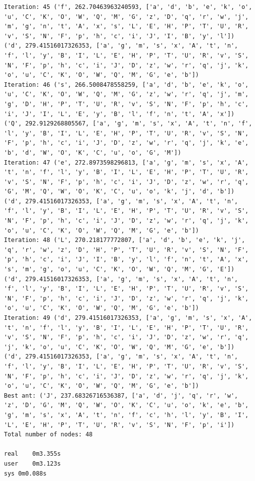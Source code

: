 \documentclass[11pt]{article}
\begin{document}
\begin{lstlisting}
Iteration: 45 ('f', 262.70463963240593, ['a', 'd', 'b', 'e', 'k', 'o', 'u', 'C', 'K', 'O', 'W', 'Q', 'M', 'G', 'z', 'D', 'q', 'r', 'w', 'j', 'm', 'g', 'n', 't', 'A', 'x', 's', 'L', 'E', 'H', 'P', 'T', 'U', 'R', 'v', 'S', 'N', 'F', 'p', 'h', 'c', 'i', 'J', 'I', 'B', 'y', 'l']) ('d', 279.41516017326353, ['a', 'g', 'm', 's', 'x', 'A', 't', 'n', 'f', 'l', 'y', 'B', 'I', 'L', 'E', 'H', 'P', 'T', 'U', 'R', 'v', 'S', 'N', 'F', 'p', 'h', 'c', 'i', 'J', 'D', 'z', 'w', 'r', 'q', 'j', 'k', 'o', 'u', 'C', 'K', 'O', 'W', 'Q', 'M', 'G', 'e', 'b'])
Iteration: 46 ('s', 266.5008478558259, ['a', 'd', 'b', 'e', 'k', 'o', 'u', 'C', 'K', 'O', 'W', 'Q', 'M', 'G', 'z', 'w', 'r', 'q', 'j', 'm', 'g', 'D', 'H', 'P', 'T', 'U', 'R', 'v', 'S', 'N', 'F', 'p', 'h', 'c', 'i', 'J', 'I', 'L', 'E', 'y', 'B', 'l', 'f', 'n', 't', 'A', 'x']) ('Q', 292.9129268805567, ['a', 'g', 'm', 's', 'x', 'A', 't', 'n', 'f', 'l', 'y', 'B', 'I', 'L', 'E', 'H', 'P', 'T', 'U', 'R', 'v', 'S', 'N', 'F', 'p', 'h', 'c', 'i', 'J', 'D', 'z', 'w', 'r', 'q', 'j', 'k', 'e', 'b', 'd', 'W', 'O', 'K', 'C', 'u', 'o', 'G', 'M'])
Iteration: 47 ('e', 272.8973598296813, ['a', 'g', 'm', 's', 'x', 'A', 't', 'n', 'f', 'l', 'y', 'B', 'I', 'L', 'E', 'H', 'P', 'T', 'U', 'R', 'v', 'S', 'N', 'F', 'p', 'h', 'c', 'i', 'J', 'D', 'z', 'w', 'r', 'q', 'G', 'M', 'Q', 'W', 'O', 'K', 'C', 'u', 'o', 'k', 'j', 'd', 'b']) ('d', 279.41516017326353, ['a', 'g', 'm', 's', 'x', 'A', 't', 'n', 'f', 'l', 'y', 'B', 'I', 'L', 'E', 'H', 'P', 'T', 'U', 'R', 'v', 'S', 'N', 'F', 'p', 'h', 'c', 'i', 'J', 'D', 'z', 'w', 'r', 'q', 'j', 'k', 'o', 'u', 'C', 'K', 'O', 'W', 'Q', 'M', 'G', 'e', 'b'])
Iteration: 48 ('L', 270.218177772807, ['a', 'd', 'b', 'e', 'k', 'j', 'q', 'r', 'w', 'z', 'D', 'H', 'P', 'T', 'U', 'R', 'v', 'S', 'N', 'F', 'p', 'h', 'c', 'i', 'J', 'I', 'B', 'y', 'l', 'f', 'n', 't', 'A', 'x', 's', 'm', 'g', 'o', 'u', 'C', 'K', 'O', 'W', 'Q', 'M', 'G', 'E']) ('d', 279.41516017326353, ['a', 'g', 'm', 's', 'x', 'A', 't', 'n', 'f', 'l', 'y', 'B', 'I', 'L', 'E', 'H', 'P', 'T', 'U', 'R', 'v', 'S', 'N', 'F', 'p', 'h', 'c', 'i', 'J', 'D', 'z', 'w', 'r', 'q', 'j', 'k', 'o', 'u', 'C', 'K', 'O', 'W', 'Q', 'M', 'G', 'e', 'b'])
Iteration: 49 ('d', 279.41516017326353, ['a', 'g', 'm', 's', 'x', 'A', 't', 'n', 'f', 'l', 'y', 'B', 'I', 'L', 'E', 'H', 'P', 'T', 'U', 'R', 'v', 'S', 'N', 'F', 'p', 'h', 'c', 'i', 'J', 'D', 'z', 'w', 'r', 'q', 'j', 'k', 'o', 'u', 'C', 'K', 'O', 'W', 'Q', 'M', 'G', 'e', 'b']) ('d', 279.41516017326353, ['a', 'g', 'm', 's', 'x', 'A', 't', 'n', 'f', 'l', 'y', 'B', 'I', 'L', 'E', 'H', 'P', 'T', 'U', 'R', 'v', 'S', 'N', 'F', 'p', 'h', 'c', 'i', 'J', 'D', 'z', 'w', 'r', 'q', 'j', 'k', 'o', 'u', 'C', 'K', 'O', 'W', 'Q', 'M', 'G', 'e', 'b'])
Best ant: ('J', 237.68326716536387, ['a', 'd', 'j', 'q', 'r', 'w', 'z', 'D', 'G', 'M', 'Q', 'W', 'O', 'K', 'C', 'u', 'o', 'k', 'e', 'b', 'g', 'm', 's', 'x', 'A', 't', 'n', 'f', 'c', 'h', 'l', 'y', 'B', 'I', 'L', 'E', 'H', 'P', 'T', 'U', 'R', 'v', 'S', 'N', 'F', 'p', 'i'])
Total number of nodes: 48

real	0m3.355s
user	0m3.123s
sys	0m0.088s
\end{lstlisting}

\end{document}
